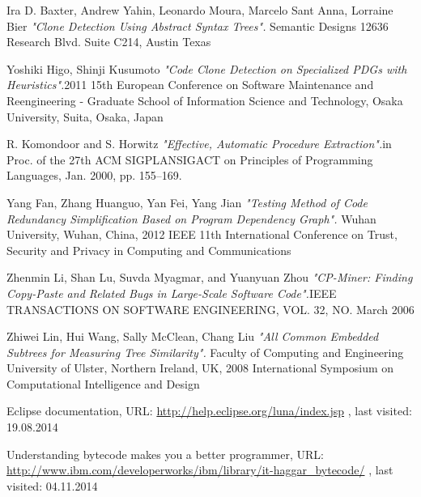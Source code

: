 \documentclass{report}
\begin{document}
\begin{thebibliography}{100}
 Ira D. Baxter, Andrew Yahin, Leonardo Moura, Marcelo Sant Anna, Lorraine Bier \emph{"Clone Detection Using Abstract Syntax Trees".} Semantic Designs 12636 Research Blvd. Suite C214, Austin Texas

 Yoshiki Higo, Shinji Kusumoto \emph{"Code Clone Detection on Specialized PDGs with Heuristics".}2011 15th European Conference on Software Maintenance and Reengineering - Graduate School of Information Science and Technology, Osaka University, Suita, Osaka, Japan

 R. Komondoor and S. Horwitz \emph{"Effective, Automatic Procedure Extraction".}in Proc. of the 27th ACM SIGPLANSIGACT
on Principles of Programming Languages, Jan. 2000, pp. 155–169.

 Yang Fan, Zhang Huanguo, Yan Fei, Yang Jian \emph{"Testing Method of Code Redundancy Simplification Based on Program Dependency Graph".} Wuhan University, Wuhan, China,
2012 IEEE 11th International Conference on Trust, Security and Privacy in Computing and Communications

 Zhenmin Li, Shan Lu, Suvda Myagmar, and Yuanyuan Zhou \emph{"CP-Miner: Finding Copy-Paste and
Related Bugs in Large-Scale Software Code".}IEEE TRANSACTIONS ON SOFTWARE ENGINEERING, VOL. 32, NO. March 2006

 Zhiwei Lin, Hui Wang, Sally McClean, Chang Liu \emph{"All Common Embedded Subtrees for Measuring Tree Similarity".} Faculty of Computing and Engineering
University of Ulster, Northern Ireland, UK,
2008 International Symposium on Computational Intelligence and Design

 Eclipse documentation, URL: \url{http://help.eclipse.org/luna/index.jsp} , last visited: 19.08.2014

 Understanding bytecode makes you a better programmer, URL: \url{http://www.ibm.com/developerworks/ibm/library/it-haggar_bytecode/} , last visited: 04.11.2014

\end{thebibliography} 
\end{document}
